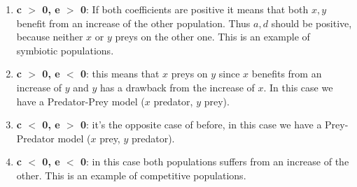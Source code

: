 \begin{enumerate}
\item \textbf{c $\boldsymbol >$ 0, e $\boldsymbol >$ 0}: If both coefficients are positive it means that both $x,y$ benefit from an increase of the other population. Thus $a,d$ should be positive, because neither $x$ or $y$ preys on the other one. This is an example of symbiotic populations.
\item \textbf{c $\boldsymbol >$ 0, e $\boldsymbol <$ 0}: this means that $x$ preys on $y$ since $x$ benefits from an increase of $y$ and $y$ has a drawback from the increase of $x$. In this case we have a Predator-Prey model ($x$ predator, $y$ prey).
\item \textbf{c $\boldsymbol <$ 0, e $\boldsymbol >$ 0}: it's the opposite case of before, in this case we have a Prey-Predator model ($x$ prey, $y$ predator).
\item \textbf{c $\boldsymbol <$ 0, e $\boldsymbol <$ 0}: in this case  both populations suffers from an increase of the other. This is an example of competitive populations.
\end{enumerate}